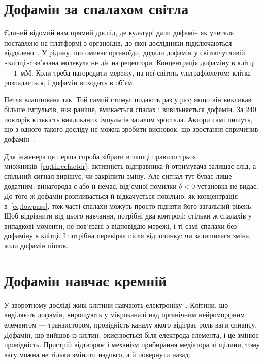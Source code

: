\section{Дофамін за спалахом світла}
\label{sec:dishdopamine}

Єдиний відомий нам прямий дослід, де культурі дали дофамін як учителя, поставлено на платформі з органоїдів, до якої дослідники підключаються віддалено~\cite{Jordan2024}. У рідину, що омиває органоїди, додали дофамін у світлочутливій «клітці»: зв'язана молекула не діє на рецептори. Концентрація дофаміну в клітці --- $1$~мМ. Коли треба нагородити мережу, на неї світять ультрафіолетом: клітка розпадається, і дофамін виходить в об'єм.

Петля влаштована так. Той самий стимул подають раз у раз; якщо він викликав більше імпульсів, ніж раніше, вмикається спалах і вивільняється дофамін. За $240$ повторів кількість викликаних імпульсів загалом зростала. Автори самі пишуть, що з одного такого досліду не можна зробити висновок, що зростання спричинив дофамін~\cite{Jordan2024}.

Для інженера це перша спроба зібрати в чашці правило трьох множників~\eqref{eq:threefactor}: активність відправника й отримувача залишає слід, а спільний сигнал вирішує, чи закріпити зміну. Але сигнал тут буває лише додатним: винагорода є або її немає, від'ємної помилки $\delta<0$ установка не видає. До того ж дофамін розпливається й відкачується повільно, як концентрація в~\eqref{eq:lowpass}, тож часті спалахи можуть просто підняти його загальний рівень. Щоб відрізнити від цього навчання, потрібні два контролі: стільки ж спалахів у випадкові моменти, не пов'язані з відповіддю мережі, і ті самі спалахи без дофаміну в клітці. І потрібна перевірка після відпочинку: чи залишилася зміна, коли дофамін пішов.

\section{Дофамін навчає кремній}
\label{sec:biohybrid}

У зворотному досліді живі клітини навчають електроніку~\cite{Keene2020}. Клітини, що виділяють дофамін, вирощують у мікроканалі над органічним нейроморфним елементом --- транзистором, провідність каналу якого відіграє роль ваги синапсу. Дофамін, що вийшов із клітин, окиснюється біля електрода елемента, і це змінює провідність. Пристрій відтворює і механізм прибирання медіатора зі щілини, тому вагу можна не тільки змінити надовго, а й повернути назад.

